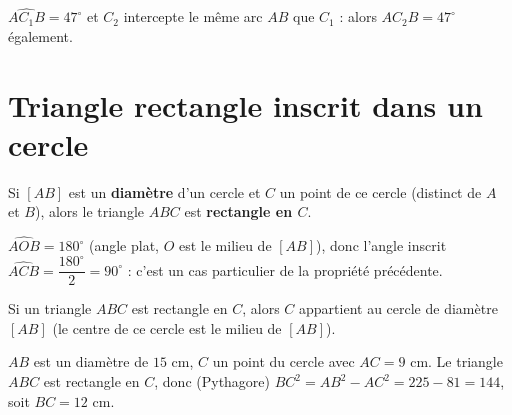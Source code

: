 \begin{exemple}
$\widehat{AC_1B}=47^{\circ}$ et $C_2$ intercepte le même arc $AB$ que $C_1$ : alors
$\widehat{AC_2B}=47^{\circ}$ également.
\end{exemple}

\section{Triangle rectangle inscrit dans un cercle}

\begin{propriete}
Si $[AB]$ est un \textbf{diamètre} d'un cercle et $C$ un point de ce cercle (distinct de
$A$ et $B$), alors le triangle $ABC$ est \textbf{rectangle en $C$}.
\end{propriete}

\begin{illus}
\end{illus}

\begin{remarque}[Justification]
$\widehat{AOB}=180^{\circ}$ (angle plat, $O$ est le milieu de $[AB]$), donc l'angle inscrit
$\widehat{ACB}=\dfrac{180^{\circ}}2=90^{\circ}$ : c'est un cas particulier de la propriété
précédente.
\end{remarque}

\begin{propriete}[Réciproque]
Si un triangle $ABC$ est rectangle en $C$, alors $C$ appartient au cercle de diamètre
$[AB]$ (le centre de ce cercle est le milieu de $[AB]$).
\end{propriete}

\begin{exemple}
$AB$ est un diamètre de $15$ cm, $C$ un point du cercle avec $AC=9$ cm. Le triangle $ABC$
est rectangle en $C$, donc (Pythagore) $BC^{2}=AB^{2}-AC^{2}=225-81=144$, soit $BC=12$ cm.
\end{exemple}

